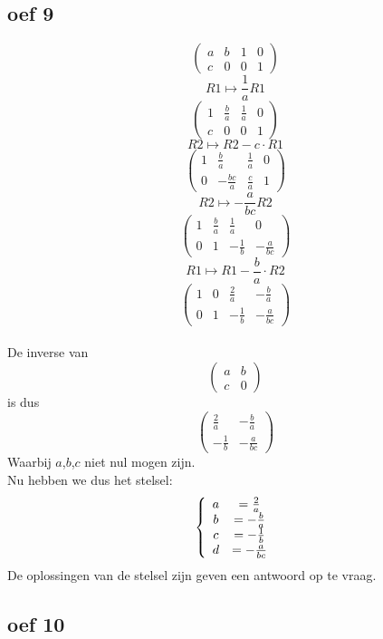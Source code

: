 \documentclass[lineaire_algebra_oplossingen.tex]{subfiles}
\begin{document}
\subsection{oef 9}

\[
\begin{pmatrix}
a & b & 1 & 0\\
c & 0 & 0 & 1
\end{pmatrix}
\]
\[ R1 \longmapsto \frac{1}{a} R1 \]
\[
\begin{pmatrix}
1 & \frac{b}{a} & \frac{1}{a} & 0\\
c & 0 & 0 & 1
\end{pmatrix}
\]
\[ R2 \longmapsto R2 - c \cdot R1\]
\[
\begin{pmatrix}
1 & \frac{b}{a} & \frac{1}{a} & 0\\
0 & -\frac{bc}{a} & \frac{c}{a} & 1
\end{pmatrix}
\]
\[ R2 \longmapsto -\frac{a}{bc} R2 \]
\[
\begin{pmatrix}
1 & \frac{b}{a} & \frac{1}{a} & 0\\
0 & 1 & -\frac{1}{b} & -\frac{a}{bc}
\end{pmatrix}
\]
\[ R1 \longmapsto R1 - \frac{b}{a} \cdot R2\]
\[
\begin{pmatrix}
1 & 0 & \frac{2}{a} & -\frac{b}{a}\\
0 & 1 & -\frac{1}{b} & -\frac{a}{bc}
\end{pmatrix}
\]
\\De inverse van 
\[
\begin{pmatrix}
a & b\\
c & 0
\end{pmatrix}
\]
is dus
\[
\begin{pmatrix}
\frac{2}{a} & -\frac{b}{a}\\
-\frac{1}{b} & -\frac{a}{bc}
\end{pmatrix}
\]
Waarbij $a$,$b$,$c$ niet nul mogen zijn.\\
Nu hebben we dus het stelsel:
\[
\left\lbrace
\begin{array}{c c}
a &= \frac{2}{a}\\
b &= -\frac{b}{a}\\
c &= -\frac{1}{b}\\
d &= -\frac{a}{bc}
\end{array}
\right.
\]
De oplossingen van de stelsel zijn geven een antwoord op te vraag.

\subsection{oef 10}
\end{document}
